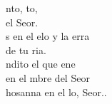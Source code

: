 \begin{cancion}%
	nto, to,\\
	 el Seor.\\
	s en el elo y la erra\\
	de tu ria.\\
	ndito el que ene\\
	en el mbre del Seor\\
	hosanna en el lo, Seor..\\
\end{cancion}%
